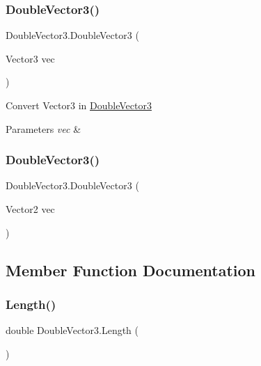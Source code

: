 \subsubsection{\texorpdfstring{DoubleVector3()}{DoubleVector3()}\hspace{0.1cm}{\footnotesize\ttfamily [3/4]}}
{\footnotesize\ttfamily Double\+Vector3.\+Double\+Vector3 (\begin{DoxyParamCaption}\item[{Vector3}]{vec }\end{DoxyParamCaption})}



Convert Vector3 in \mbox{\hyperlink{class_double_vector3}{Double\+Vector3}} 


\begin{DoxyParams}{Parameters}
{\em vec} & \\
\hline
\end{DoxyParams}
\mbox{\label{class_double_vector3_af5e455ab247ae9bc0e393d04a03495c4}} 
\subsubsection{\texorpdfstring{DoubleVector3()}{DoubleVector3()}\hspace{0.1cm}{\footnotesize\ttfamily [4/4]}}
{\footnotesize\ttfamily Double\+Vector3.\+Double\+Vector3 (\begin{DoxyParamCaption}\item[{Vector2}]{vec }\end{DoxyParamCaption})}



\subsection{Member Function Documentation}
\mbox{\label{class_double_vector3_afc1034f4bff688a4d67ac2d72d7f2e6b}} 
\subsubsection{\texorpdfstring{Length()}{Length()}}
{\footnotesize\ttfamily double Double\+Vector3.\+Length (\begin{DoxyParamCaption}{ }\end{DoxyParamCaption})}



